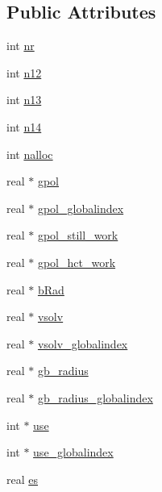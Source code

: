 \subsection*{\-Public \-Attributes}
\begin{DoxyCompactItemize}
\item 
int \hyperlink{structgmx__genborn__t_a89acea3210a44a2f22af8d8595e9e0e0}{nr}
\item 
int \hyperlink{structgmx__genborn__t_acd7a939bd919abf70694ff9d21f6f4a0}{n12}
\item 
int \hyperlink{structgmx__genborn__t_a2c221a37bd88eb839691ef7d6b9c8c17}{n13}
\item 
int \hyperlink{structgmx__genborn__t_aee29c6ffa20a88f4a511b5aff0a789ca}{n14}
\item 
int \hyperlink{structgmx__genborn__t_a7fb7a520834ac762bc6d15f707f5b411}{nalloc}
\item 
real $\ast$ \hyperlink{structgmx__genborn__t_a51a2a8195d82c60ae26fe76365340eaf}{gpol}
\item 
real $\ast$ \hyperlink{structgmx__genborn__t_af79496df6ee5704af5a1351ebf67751e}{gpol\-\_\-globalindex}
\item 
real $\ast$ \hyperlink{structgmx__genborn__t_a6b43cf8ce0136542b6c1d81967b8599e}{gpol\-\_\-still\-\_\-work}
\item 
real $\ast$ \hyperlink{structgmx__genborn__t_a278f57a5105446ca30eb7ddfc95048b8}{gpol\-\_\-hct\-\_\-work}
\item 
real $\ast$ \hyperlink{structgmx__genborn__t_a0bef143f83d5a52feef518e94dc3e1a7}{b\-Rad}
\item 
real $\ast$ \hyperlink{structgmx__genborn__t_a90637c8076aab25db3145c9706b94b8b}{vsolv}
\item 
real $\ast$ \hyperlink{structgmx__genborn__t_abcb78753e2c9cfce3a47c76a66fd3578}{vsolv\-\_\-globalindex}
\item 
real $\ast$ \hyperlink{structgmx__genborn__t_a3dddc16eec44cc57c10f4a28010c8736}{gb\-\_\-radius}
\item 
real $\ast$ \hyperlink{structgmx__genborn__t_a4b14efc71bbcdcddefbcda20ecd43af7}{gb\-\_\-radius\-\_\-globalindex}
\item 
int $\ast$ \hyperlink{structgmx__genborn__t_a13ec37b18151ce75019b00497c116fef}{use}
\item 
int $\ast$ \hyperlink{structgmx__genborn__t_a4fade955c6db994d0de7d9a633f0f883}{use\-\_\-globalindex}
\item 
real \hyperlink{structgmx__genborn__t_a4ad9deed67875e63483cc12dca4ff5b0}{es}

\end{DoxyCompactItemize}
